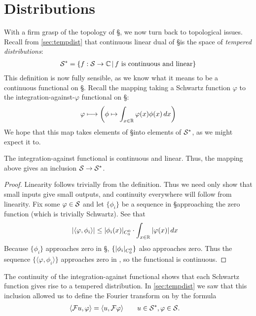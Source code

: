 
  \setcounter{chapter}{2}
  \setcounter{thm}{0}
  \chapter{Distributions}
  \label{ch:dist}
  
  With a firm grasp of the topology of \S, we now turn back to topological issues.
  Recall from \cref{sec:tempdist} that continuous linear dual of \S is the space of \emph{tempered distributions}:
  \begin{align*}
    \S^* = \{f:\S\rightarrow\C\,\vert\,f\text{ is continuous and linear}\}
  \end{align*}
  This definition is now fully sensible, as we know what it means to be a continuous functional on \S.
  Recall the mapping taking a Schwartz function $\varphi$ to the integration-against-$\varphi$ functional on \S:
  \begin{align*}
    \varphi \longmapsto \left( \phi \mapsto \int_{x\in\R} \varphi(x) \phi(x)\,dx \right)
  \end{align*}
  We hope that this map takes elements of \S into elements of $\S^*$, as we might expect it to.
  \begin{thm}
    The integration-against functional is continuous and linear.
    Thus, the mapping above gives an inclusion $\S\rightarrow\S^*$.
  \end{thm}
  \begin{proof}
    Linearity follows trivially from the definition.
    Thus we need only show that small inputs give small outputs, and continuity everywhere will follow from linearity.
    Fix some $\varphi\in\S$ and let $\{\phi_i\}$ be a sequence in \S approaching the zero function (which is trivially Schwartz).
    See that
    \begin{align*}
      |\langle\varphi,\phi_i\rangle| 
      &\le |\phi_i(x)|_\Coo \cdot \int_{x\in\R} |\varphi(x)|\,dx
    \end{align*}
    Because $\{\phi_i\}$ approaches zero in \S, $\{|\phi_i|_\Coo\}$ also approaches zero.
    Thus the sequence $\{\langle\varphi,\phi_i\rangle\}$ approaches zero in \C, so the functional is continuous.
  \end{proof}

  The continuity of the integration-against functional shows that each Schwartz function gives rise to a tempered distribution.
  In \cref{sec:tempdist} we saw that this inclusion allowed us to define the Fourier transform on \SS by the formula
  \begin{align*}
    \langle\F u, \varphi\rangle &= \langle u, \F\varphi\rangle
    \qquad u\in\SS, \varphi\in\S \text{.}
  \end{align*}
  
